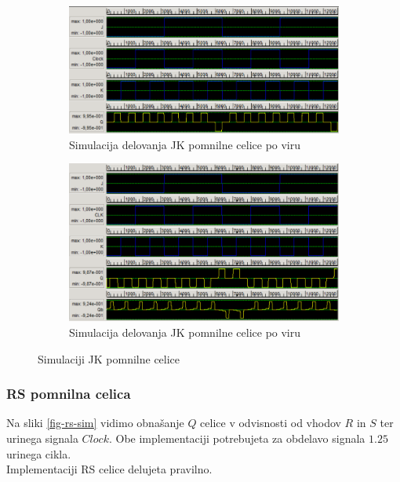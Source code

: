 \documentclass[a4paper, 11pt]{article}
\begin{document}
\begin{figure}[h!]
	\begin{subfigure}[b]{\textwidth}
	\includegraphics[width=\textwidth]{../img/vir_4/sim_jk.png}
	\caption{Simulacija delovanja JK pomnilne celice po viru \cite{quantum_dot}}
	\label{fig-jk-1-sim}
	\end{subfigure}
	\begin{subfigure}[b]{\textwidth}
	\includegraphics[width=\textwidth]{../img/vir_5/sim_jk.png}
	\caption{Simulacija delovanja JK pomnilne celice po viru \cite{a_novel_approach}}
	\label{fig-jk-2-sim}
	\end{subfigure}
	\caption{Simulaciji JK pomnilne celice}
	\label{fig-jk-sim}
\end{figure}

\subsubsection{RS pomnilna celica}
Na sliki \ref{fig-rs-sim} vidimo obnašanje $Q$ celice v odvisnosti od vhodov $R$ in $S$ ter urinega signala $Clock$.
Obe implementaciji potrebujeta za obdelavo signala $1.25$ urinega cikla.\\
Implementaciji RS celice delujeta pravilno.
\end{document}
